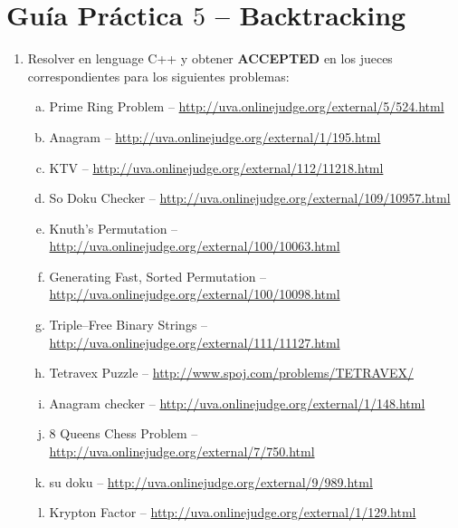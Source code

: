 




\section*{Gu\'ia Pr\'actica $5$ -- Backtracking}

\begin{enumerate}[1 -]
	
	\item Resolver en lenguage C++ y obtener \textbf{ACCEPTED} en los jueces correspondientes para los siguientes problemas:
	
	\begin{enumerate}[a)]
		\item Prime Ring Problem -- \href{http://uva.onlinejudge.org/external/5/524.html}{http://uva.onlinejudge.org/external/5/524.html}
		\item Anagram -- \href{http://uva.onlinejudge.org/external/1/195.html}{http://uva.onlinejudge.org/external/1/195.html}
		\item KTV -- \href{http://uva.onlinejudge.org/external/112/11218.html}{http://uva.onlinejudge.org/external/112/11218.html}
		\item So Doku Checker -- \href{http://uva.onlinejudge.org/external/109/10957.html}{http://uva.onlinejudge.org/external/109/10957.html}		
		\item Knuth’s Permutation -- \href{http://uva.onlinejudge.org/external/100/10063.html}{http://uva.onlinejudge.org/external/100/10063.html}
		\item Generating Fast, Sorted Permutation -- \href{http://uva.onlinejudge.org/external/100/10098.html}{http://uva.onlinejudge.org/external/100/10098.html}
		\item Triple--Free Binary Strings -- \href{http://uva.onlinejudge.org/external/111/11127.html}{http://uva.onlinejudge.org/external/111/11127.html}
		\item Tetravex Puzzle -- \href{http://www.spoj.com/problems/TETRAVEX/}{http://www.spoj.com/problems/TETRAVEX/}
		\item Anagram checker -- \href{http://uva.onlinejudge.org/external/1/148.html}{http://uva.onlinejudge.org/external/1/148.html}
		\item 8 Queens Chess Problem  -- \href{http://uva.onlinejudge.org/external/7/750.html}{http://uva.onlinejudge.org/external/7/750.html}
		\item su doku -- \href{http://uva.onlinejudge.org/external/9/989.html}{http://uva.onlinejudge.org/external/9/989.html}
		\item Krypton Factor -- \href{http://uva.onlinejudge.org/external/1/129.html}{http://uva.onlinejudge.org/external/1/129.html}
	\end{enumerate}

\end{enumerate}






